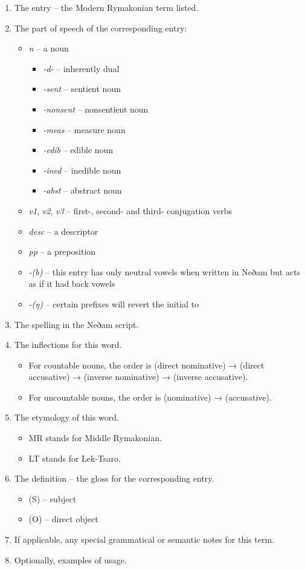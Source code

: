 \documentclass{book}
\newcommand{\lname}{Modern Rymakonian}
\begin{document}
\begin{enumerate}
    \item The entry -- the \lname{} term listed.
    \item The part of speech of the corresponding entry:
    \begin{itemize}
        \item \textit{n} -- a noun
        \begin{itemize}
          \item \textit{-d-} -- inherently dual
          \item \textit{-sent} -- sentient noun
          \item \textit{-nonsent} -- nonsentient noun
          \item \textit{-meas} -- measure noun
          \item \textit{-edib} -- edible noun
          \item \textit{-ined} -- inedible noun
          \item \textit{-abst} -- abstract noun
        \end{itemize}
        \item \textit{v1}, \textit{v2}, \textit{v3} -- first-, second- and third- conjugation verbs
        \item \textit{desc} -- a descriptor
        \item \textit{pp} -- a preposition
        \item \textit{-(b)} -- this entry has only neutral vowels when written in Neðam but acts as if it had back vowels
        \item \textit{-(ŋ)} -- certain prefixes will revert the initial  to 
    \end{itemize}
    \item The spelling in the Neðam script.
    \item The inflections for this word.
    \begin{itemize}
      \item For countable nouns, the order is (direct nominative) → (direct accusative) → (inverse nominative) → (inverse accusative).
      \item For uncountable nouns, the order is (nominative) → (accusative).
    \end{itemize}
    \item The etymology of this word.
    \begin{itemize}
      \item MR stands for Middle Rymakonian.
      \item LT stands for Lek-Tsaro.
    \end{itemize}
    \item The definition -- the gloss for the corresponding entry.
    \begin{itemize}
        \item (S) -- subject
        \item (O) -- direct object
    \end{itemize}
    \item If applicable, any special grammatical or semantic notes for this term.
    \item Optionally, examples of usage.
\end{enumerate}

\begin{multicols}{2}
    
\end{multicols}
\end{document}
